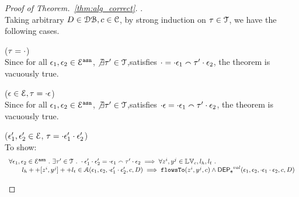 \begin{proof}[Proof of Theorem.~\ref{thm:alg_correct}].
\\
Taking arbitrary $ D \in \mathcal{DB} , c \in \mathcal{C}$,
by strong induction on $\mathtt{\tau} \in \mathcal{T}$, we have the following cases.
\begin{case}($\mathtt{\tau} = \cdot$)
\\
Since for all $\mathtt{\epsilon}_1, \mathtt{\epsilon}_2 \in \mathcal{E}^{\mathtt{{asn}}}$,
 $\not\exists \mathtt{\tau}' \in \mathcal{T}$,satisfies $
\cdot  = \cdot {} \mathtt{\epsilon}_1 \smallfrown \mathtt{\tau}' \cdot \mathtt{\epsilon}_2$, the theorem is vacuously true.
\end{case}
%
\begin{case}($\mathtt{\epsilon} \in \mathcal{E}, \mathtt{\tau} = \cdot \mathtt{\epsilon}$)
\\
Since for all $\mathtt{\epsilon}_1, \mathtt{\epsilon}_2 \in \mathcal{E}^{\mathtt{{asn}}}$,
 $\not\exists \mathtt{\tau}' \in \mathcal{T}$,satisfies $
\cdot  \mathtt{\epsilon} = \cdot \mathtt{\epsilon}_1 \smallfrown \mathtt{\tau}' \cdot \mathtt{\epsilon}_2$, the theorem is vacuously true.
\end{case}
%
%
\begin{case}
\label{case:alg_correct_base}
($\mathtt{\epsilon}_1', \mathtt{\epsilon}_2' \in \mathcal{E} $, $\mathtt{\tau} = \cdot {} \mathtt{\epsilon}_1' \cdot {} \mathtt{\epsilon}_2'$)
\\
To show:
\[
\begin{array}{l}
  \forall \mathtt{\epsilon}_1, \mathtt{\epsilon}_2 \in \mathcal{E}^{\mathtt{{asn}}} ~.~
  \exists \mathtt{\tau}' \in \mathcal{T} ~.~ \cdot {} \mathtt{\epsilon}_1' \cdot {} \mathtt{\epsilon}_2' = \cdot \mathtt{\epsilon}_1 \smallfrown \mathtt{\tau}' \cdot \mathtt{\epsilon}_2
  \implies    
  \forall  z^i, y^j \in \mathbb{LV}_c, l_h, l_t ~.~ 
    \\ \qquad 
    l_h ++ [z^i, y^j] ++ l_t \in \mathcal{A}(\mathtt{\epsilon}_1, \mathtt{\epsilon}_2, \cdot {} \mathtt{\epsilon}_1' \cdot {} \mathtt{\epsilon}_2', c, D)
   \implies \mathtt{flowsTo}(z^i, y^j, c) \land \mathsf{DEP_{\mathtt{e}}}^{val}(\mathtt{\epsilon}_1, \mathtt{\epsilon}_2, \cdot  \mathtt{\epsilon}_1 \cdot \mathtt{\epsilon}_2, c, D)

\end{array}\]
\end{case}
\end{proof}
